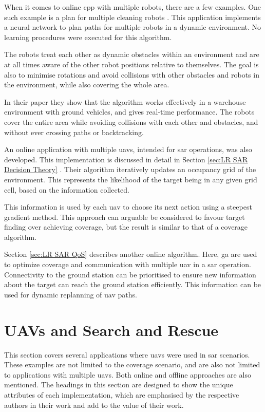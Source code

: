 When it comes to online \ac{cpp} with multiple robots, there are a few examples. One such example is a plan for multiple cleaning robots \cite{Luo2002}. This application implements a neural network to plan paths for multiple robots in a dynamic environment. No learning procedures were executed for this algorithm. 

The robots treat each other as dynamic obstacles within an environment and are at all times aware of the other robot positions relative to themselves. The goal is also to minimise rotations and avoid collisions with other obstacles and robots in the environment, while also covering the whole area. 

In their paper they show that the algorithm works effectively in a warehouse environment with ground vehicles, and gives real-time performance. The robots cover the entire area while avoiding collisions with each other and obstacles, and without ever crossing paths or backtracking.

An online application with multiple \acp{uav}, intended for \acl{sar} operations, was also developed. This implementation is discussed in detail in Section \ref{sec:LR SAR Decision Theory} \cite{WaharteFINAL2010}. Their algorithm iteratively updates an occupancy grid of the environment. This represents the likelihood of the target being in any given grid cell, based on the information collected. 

This information is used by each \ac{uav} to choose its next action using a steepest gradient method. This approach can arguable be considered to favour target finding over achieving coverage, but the result is similar to that of a coverage algorithm. 

Section \ref{sec:LR SAR QoS} describes another online algorithm. Here, \acs{ga} are used to optimize coverage and communication with multiple \acs{uav} in a \ac{sar} operation. Connectivity to the ground station can be prioritised to ensure new information about the target can reach the ground station efficiently. This information can be used for dynamic replanning of \ac{uav} paths. \cite{Hayat2020}

\section{UAVs and Search and Rescue}
This section covers several applications where \acp{uav} were used in \ac{sar} scenarios. These examples are not limited to the coverage scenario, and are also not limited to applications with multiple \acp{uav}. Both online and offline approaches are also mentioned. The headings in this section are designed to show the unique attributes of each implementation, which are emphasised by the respective authors in their work and add to the value of their work.
